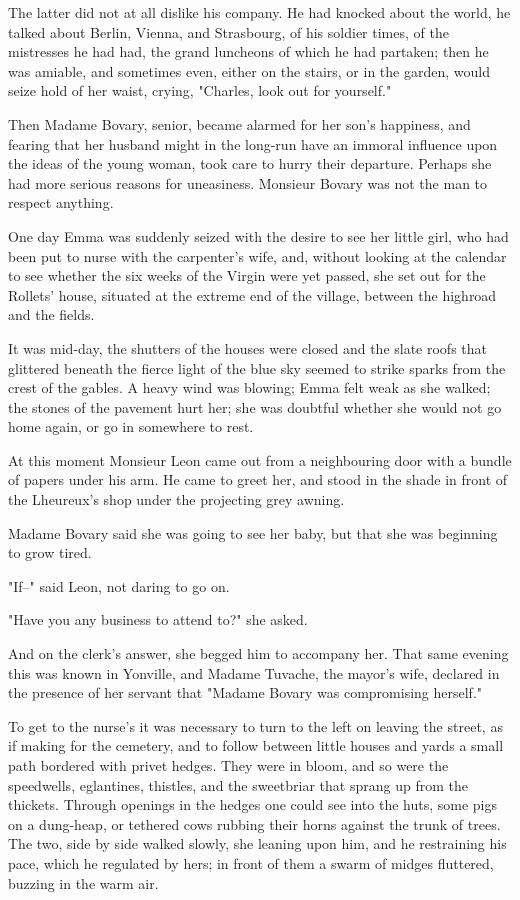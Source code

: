 \documentclass[11pt,twocolumn]{ltugboat}
\begin{document}
The latter did not at all dislike his company. He had knocked about the
world, he talked about Berlin, Vienna, and Strasbourg, of his soldier
times, of the mistresses he had had, the grand luncheons of which he had
partaken; then he was amiable, and sometimes even, either on the stairs,
or in the garden, would seize hold of her waist, crying, "Charles, look
out for yourself."

Then Madame Bovary, senior, became alarmed for her son's happiness, and
fearing that her husband might in the long-run have an immoral influence
upon the ideas of the young woman, took care to hurry their departure.
Perhaps she had more serious reasons for uneasiness. Monsieur Bovary was
not the man to respect anything.

One day Emma was suddenly seized with the desire to see her little
girl, who had been put to nurse with the carpenter's wife, and, without
looking at the calendar to see whether the six weeks of the Virgin were
yet passed, she set out for the Rollets' house, situated at the extreme
end of the village, between the highroad and the fields.

It was mid-day, the shutters of the houses were closed and the slate
roofs that glittered beneath the fierce light of the blue sky seemed to
strike sparks from the crest of the gables. A heavy wind was blowing;
Emma felt weak as she walked; the stones of the pavement hurt her; she
was doubtful whether she would not go home again, or go in somewhere to
rest.

At this moment Monsieur Leon came out from a neighbouring door with a
bundle of papers under his arm. He came to greet her, and stood in the
shade in front of the Lheureux's shop under the projecting grey awning.

Madame Bovary said she was going to see her baby, but that she was
beginning to grow tired.

"If--" said Leon, not daring to go on.

"Have you any business to attend to?" she asked.

And on the clerk's answer, she begged him to accompany her. That same
evening this was known in Yonville, and Madame Tuvache, the mayor's
wife, declared in the presence of her servant that "Madame Bovary was
compromising herself."

To get to the nurse's it was necessary to turn to the left on leaving
the street, as if making for the cemetery, and to follow between little
houses and yards a small path bordered with privet hedges. They were
in bloom, and so were the speedwells, eglantines, thistles, and the
sweetbriar that sprang up from the thickets. Through openings in
the hedges one could see into the huts, some pigs on a dung-heap, or
tethered cows rubbing their horns against the trunk of trees. The two,
side by side walked slowly, she leaning upon him, and he restraining
his pace, which he regulated by hers; in front of them a swarm of midges
fluttered, buzzing in the warm air.
\end{document}
